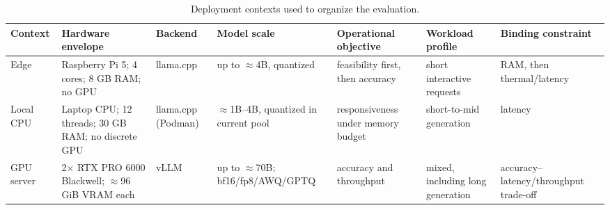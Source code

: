 \begin{table}[t]
\centering
\caption{Deployment contexts used to organize the evaluation.}
\label{tab:deployment-contexts}
\scriptsize
\setlength{\tabcolsep}{3.2pt}
\renewcommand{\arraystretch}{1.08}
\begin{tabularx}{\textwidth}{@{}lLLLLLL@{}}
\toprule
\textbf{Context} & \textbf{Hardware envelope} & \textbf{Backend} & \textbf{Model scale} & \textbf{Operational objective} & \textbf{Workload profile} & \textbf{Binding constraint} \\
\midrule
Edge & Raspberry Pi 5; 4 cores; 8 GB RAM; no GPU & llama.cpp & up to $\approx$4B, quantized & feasibility first, then accuracy & short interactive requests & RAM, then thermal/latency \\
Local CPU & Laptop CPU; 12 threads; 30 GB RAM; no discrete GPU & llama.cpp (Podman) & $\approx$1B--4B, quantized in current pool & responsiveness under memory budget & short-to-mid generation & latency \\
GPU server & 2$\times$ RTX PRO 6000 Blackwell; $\approx$96 GiB VRAM each & vLLM & up to $\approx$70B; bf16/fp8/AWQ/GPTQ & accuracy and throughput & mixed, including long generation & accuracy--latency/throughput trade-off \\
\bottomrule
\end{tabularx}
\end{table}
